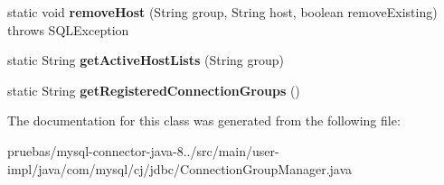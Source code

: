 \begin{DoxyCompactItemize}
static void {\bfseries remove\+Host} (String group, String host, boolean remove\+Existing)  throws S\+Q\+L\+Exception 
\item 
\mbox{\label{classcom_1_1mysql_1_1cj_1_1jdbc_1_1_connection_group_manager_abe7699bde9cd34608ce5d66090508d0d}} 
static String {\bfseries get\+Active\+Host\+Lists} (String group)
\item 
\mbox{\label{classcom_1_1mysql_1_1cj_1_1jdbc_1_1_connection_group_manager_a49efbc25f7c954fc391cfd9d3657c87c}} 
static String {\bfseries get\+Registered\+Connection\+Groups} ()
\end{DoxyCompactItemize}


The documentation for this class was generated from the following file\+:\begin{DoxyCompactItemize}
\item 
pruebas/mysql-\/connector-\/java-\/8../src/main/user-\/impl/java/com/mysql/cj/jdbc/Connection\+Group\+Manager.\+java\end{DoxyCompactItemize}
